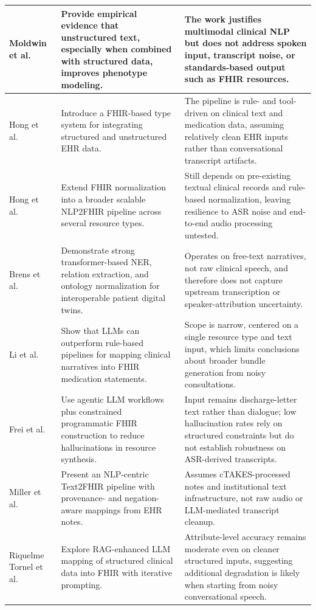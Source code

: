 \begin{longtable}{|>{\raggedright\arraybackslash}p{}|>{\raggedright\arraybackslash}p{}|>{\raggedright\arraybackslash}p{}|}
\hline
Moldwin et al.\ \cite{moldwin2021phenotyping} & Provide empirical evidence that unstructured text, especially when combined with structured data, improves phenotype modeling. & The work justifies multimodal clinical NLP but does not address spoken input, transcript noise, or standards-based output such as FHIR resources. \\
\hline
Hong et al.\ \cite{hong2017integrating} & Introduce a FHIR-based type system for integrating structured and unstructured EHR data. & The pipeline is rule- and tool-driven on clinical text and medication data, assuming relatively clean EHR inputs rather than conversational transcript artifacts. \\
\hline
Hong et al.\ \cite{hong2020nlp2fhir} & Extend FHIR normalization into a broader scalable NLP2FHIR pipeline across several resource types. & Still depends on pre-existing textual clinical records and rule-based normalization, leaving resilience to ASR noise and end-to-end audio processing untested. \\
\hline
Brens et al.\ \cite{brens2025semantic} & Demonstrate strong transformer-based NER, relation extraction, and ontology normalization for interoperable patient digital twins. & Operates on free-text narratives, not raw clinical speech, and therefore does not capture upstream transcription or speaker-attribution uncertainty. \\
\hline
Li et al.\ \cite{li2024fhirgpt} & Show that LLMs can outperform rule-based pipelines for mapping clinical narratives into FHIR medication statements. & Scope is narrow, centered on a single resource type and text input, which limits conclusions about broader bundle generation from noisy consultations. \\
\hline
Frei et al.\ \cite{frei2025inferno} & Use agentic LLM workflows plus constrained programmatic FHIR construction to reduce hallucinations in resource synthesis. & Input remains discharge-letter text rather than dialogue; low hallucination rates rely on structured constraints but do not establish robustness on ASR-derived transcripts. \\
\hline
Miller et al.\ \cite{miller2023smart} & Present an NLP-centric Text2FHIR pipeline with provenance- and negation-aware mappings from EHR notes. & Assumes cTAKES-processed notes and institutional text infrastructure, not raw audio or LLM-mediated transcript cleanup. \\
\hline
Riquelme Tornel et al.\ \cite{riquelme2025llm} & Explore RAG-enhanced LLM mapping of structured clinical data into FHIR with iterative prompting. & Attribute-level accuracy remains moderate even on cleaner structured inputs, suggesting additional degradation is likely when starting from noisy conversational speech. \\
\hline
\end{longtable}
